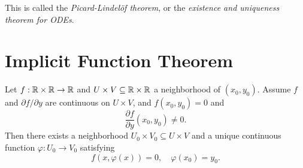 \begin{remark}
  This is called the \emph{Picard-Lindel\"of theorem},
  or the \emph{existence and uniqueness theorem for ODEs}.
\end{remark}

\section{Implicit Function Theorem}
\begin{example}
  \label{thm:implicit}
  Let $f : \mathbb{R} \times \mathbb{R} \to \mathbb{R}$ and $U \times V \subseteq \mathbb{R} \times \mathbb{R}$ a
  neighborhood of $(x_0, y_0)$. Assume $f$ and
  $\partial f / \partial y$ are continuous on
  $U \times V$, and $f(x_0, y_0) = 0$ and
  \[
    \frac{\partial f}{\partial y}(x_0, y_0) \ne 0.
  \]
  Then there exists a neighborhood
  $U_0 \times V_0 \subseteq U \times V$ and a unique
  continuous function
  $\varphi : U_0 \to V_0$ satisfying
  \[
    f(x, \varphi(x)) = 0, \quad \varphi(x_0) = y_0.
  \]
\end{example}

